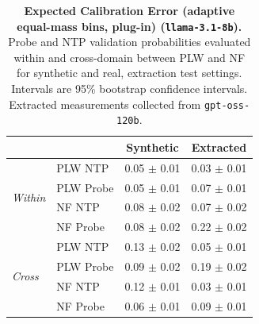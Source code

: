 \begin{table}[ht]
\centering
\begin{tabular}{ll cc}
\toprule
& & Synthetic & Extracted \\
\midrule
\multirow{4}{*}{\textit{Within}}
& PLW NTP & 0.05 $\pm$ 0.01 & 0.03 $\pm$ 0.01 \\
& PLW Probe & 0.05 $\pm$ 0.01 & 0.07 $\pm$ 0.01 \\
& NF NTP & 0.08 $\pm$ 0.02 & 0.07 $\pm$ 0.02 \\
& NF Probe & 0.08 $\pm$ 0.02 & 0.22 $\pm$ 0.02 \\
\midrule
\multirow{4}{*}{\textit{Cross}}
& PLW NTP & 0.13 $\pm$ 0.02 & 0.05 $\pm$ 0.01 \\
& PLW Probe & 0.09 $\pm$ 0.02 & 0.19 $\pm$ 0.02 \\
& NF NTP & 0.12 $\pm$ 0.01 & 0.03 $\pm$ 0.01 \\
& NF Probe & 0.06 $\pm$ 0.01 & 0.09 $\pm$ 0.01 \\
\bottomrule
\end{tabular}
\caption{\textbf{Expected Calibration Error (adaptive equal-mass bins, plug-in) (\texttt{llama-3.1-8b}).} Probe and NTP validation probabilities evaluated within and cross-domain between PLW and NF for synthetic and real, extraction test settings. Intervals are 95\% bootstrap confidence intervals. Extracted measurements collected from \texttt{gpt-oss-120b}.}
\label{tab:llama-3.1-8b-gpt-oss-120b-pond_nfix-ece_em}
\end{table}
